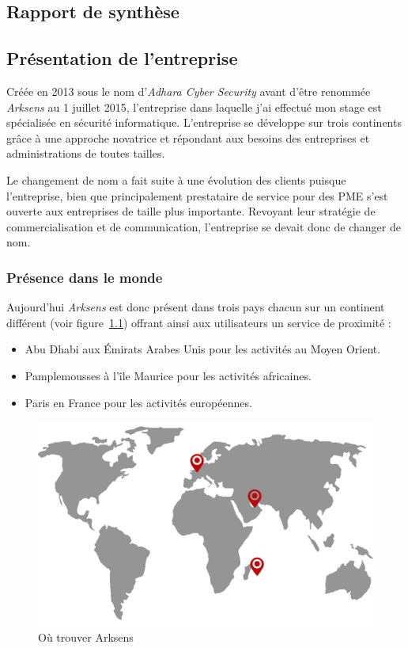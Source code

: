 \documentclass[a4paper,10pt, twoside]{report}
\begin{document}
\begin{spacing}{1.2}
\part{Rapport de synth\`ese}
\label{rapportSynthese}
\chapter{Pr\'esentation de l'entreprise}
\thispagestyle{fancy}
Cr\'e\'ee en 2013 sous le nom d'\textit{Adhara Cyber Security} avant
d'\^etre renomm\'ee \textit{Arksens} au 1 juillet 2015, l'entreprise 
dans laquelle j'ai effectu\'e mon stage est sp\'ecialis\'ee en s\'ecurit\'e
informatique. L'entreprise se d\'eveloppe sur trois continents gr\^ace \`a une
approche novatrice et r\'epondant aux besoins des entreprises et
administrations de toutes tailles.

Le changement de nom a fait suite \`a une \'evolution des clients puisque
l'entreprise, bien que principalement prestataire de service pour des PME
s'est ouverte aux entreprises de taille plus importante. Revoyant leur
strat\'egie de commercialisation et de communication, l'entreprise se devait
donc de changer de nom.

\section{Pr\'esence dans le monde}
Aujourd'hui \textit{Arksens} est donc pr\'esent dans trois pays chacun sur
un continent diff\'erent (voir figure~\ref{mapArksens}) offrant ainsi aux
utilisateurs un service de proximit\'e :
\begin{itemize}
  \item Abu Dhabi aux \'Emirats Arabes Unis pour les activit\'es au Moyen
  Orient.
  \item Pamplemousses à l’\^ile Maurice pour les activit\'es africaines.
  \item Paris en France pour les activit\'es européennes.
\end{itemize}

\begin{figure}[h!]
  \centering
  \includegraphics[scale=0.30]{map_arksens.png}
  \caption{\label{mapArksens} O\`u trouver Arksens}
\end{figure}
      

\end{spacing}
\end{document}

